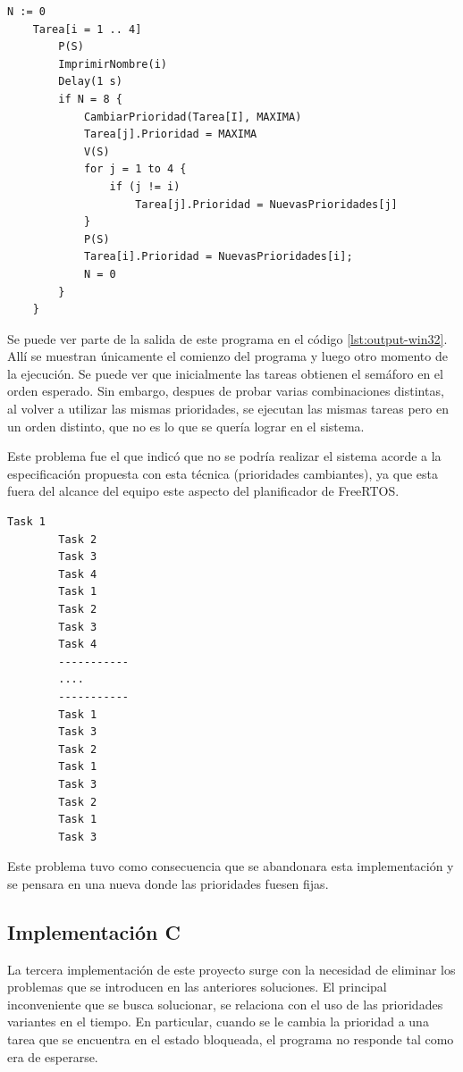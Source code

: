 	\begin{lstlisting}[float, label=lst:win32, caption=Pseudocódigo del programa escrito para FreeRTOS-Win32.]
	N := 0
	Tarea[i = 1 .. 4]
		P(S)
		ImprimirNombre(i)
		Delay(1 s)
		if N = 8 {
			CambiarPrioridad(Tarea[I], MAXIMA)
			Tarea[j].Prioridad = MAXIMA
			V(S)
			for j = 1 to 4 {
				if (j != i)
					Tarea[j].Prioridad = NuevasPrioridades[j]
			}
			P(S)
			Tarea[i].Prioridad = NuevasPrioridades[i];
			N = 0
		}
	}
	\end{lstlisting}

	Se puede ver parte de la salida de este programa en el código \ref{lst:output-win32}. Allí se muestran únicamente el comienzo del programa y luego otro momento de la ejecución. Se puede ver que inicialmente las tareas obtienen el semáforo en el orden esperado. Sin embargo, despues de probar varias combinaciones distintas, al volver a utilizar las mismas prioridades, se ejecutan las mismas tareas pero en un orden distinto, que no es lo que se quería lograr en el sistema.

	Este problema fue el que indicó que no se podría realizar el sistema acorde a la especificación propuesta con esta técnica (prioridades cambiantes), ya que esta fuera del alcance del equipo este aspecto del planificador de FreeRTOS.

	\begin{lstlisting}[float, label=lst:output-win32, caption=Salida del programa de prueba escrito para Win32.]
		Task 1
		Task 2
		Task 3
		Task 4
		Task 1
		Task 2
		Task 3
		Task 4
		-----------
		....
		-----------
		Task 1
		Task 3
		Task 2
		Task 1
		Task 3
		Task 2
		Task 1
		Task 3
	\end{lstlisting}

	Este problema tuvo como consecuencia que se abandonara esta implementación y se pensara en una nueva donde las prioridades fuesen fijas.



	\subsection{Implementación C}
	La tercera implementación de este proyecto surge con la necesidad de eliminar los problemas que se introducen en las anteriores soluciones.
	El principal inconveniente que se busca solucionar, se relaciona con el uso de las prioridades variantes en el tiempo.
	En particular, cuando se le cambia la prioridad a una tarea que se encuentra en el estado bloqueada, el programa no responde tal como era de esperarse.

